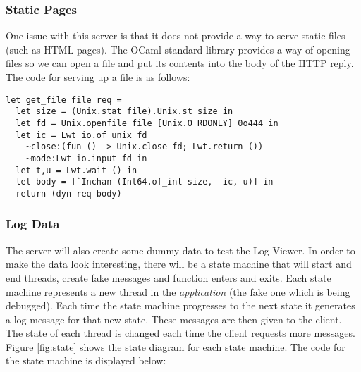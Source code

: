 \subsubsection{Static Pages}
One issue with this server is that it does not provide a way to serve static files (such as HTML pages). The OCaml standard library provides a way of opening files so we can open a file and put its contents into the body of the HTTP reply. The code for serving up a file is as follows:

\begin{lstlisting}[caption={Serve a file from disk}]
let get_file file req = 
  let size = (Unix.stat file).Unix.st_size in
  let fd = Unix.openfile file [Unix.O_RDONLY] 0o444 in
  let ic = Lwt_io.of_unix_fd
    ~close:(fun () -> Unix.close fd; Lwt.return ())
    ~mode:Lwt_io.input fd in
  let t,u = Lwt.wait () in
  let body = [`Inchan (Int64.of_int size,  ic, u)] in
  return (dyn req body)
\end{lstlisting}

\subsubsection{Log Data}
The server will also create some dummy data to test the Log Viewer. In order to make the data look interesting, there will be a state machine that will start and end threads, create fake messages and function enters and exits. Each state machine represents a new thread in the \emph{application} (the fake one which is being debugged). Each time the state machine progresses to the next state it generates a log message for that new state. These messages are then given to the client. The state of each thread is changed each time the client requests more messages. Figure \ref{fig:state} shows the state diagram for each state machine. The code for the state machine is displayed below:

